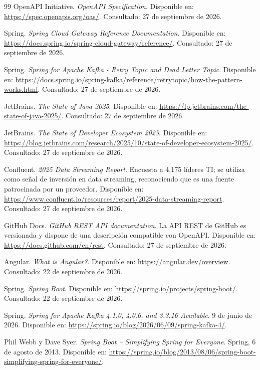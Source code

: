 \documentclass[12pt,a4paper]{article}
\begin{document}
\begin{thebibliography}{99}
OpenAPI Initiative. \textit{OpenAPI Specification}. Disponible en: \url{https://spec.openapis.org/oas/}. Consultado: 27 de septiembre de 2026.

Spring. \textit{Spring Cloud Gateway Reference Documentation}. Disponible en: \url{https://docs.spring.io/spring-cloud-gateway/reference/}. Consultado: 27 de septiembre de 2026.

Spring. \textit{Spring for Apache Kafka - Retry Topic and Dead Letter Topic}. Disponible en: \url{https://docs.spring.io/spring-kafka/reference/retrytopic/how-the-pattern-works.html}. Consultado: 27 de septiembre de 2026.

JetBrains. \textit{The State of Java 2025}. Disponible en: \url{https://lp.jetbrains.com/the-state-of-java-2025/}. Consultado: 27 de septiembre de 2026.

JetBrains. \textit{The State of Developer Ecosystem 2025}. Disponible en: \url{https://blog.jetbrains.com/research/2025/10/state-of-developer-ecosystem-2025/}. Consultado: 27 de septiembre de 2026.

Confluent. \textit{2025 Data Streaming Report}. Encuesta a 4,175 líderes TI; se utiliza como señal de inversión en data streaming, reconociendo que es una fuente patrocinada por un proveedor. Disponible en: \url{https://www.confluent.io/resources/report/2025-data-streaming-report}. Consultado: 27 de septiembre de 2026.

GitHub Docs. \textit{GitHub REST API documentation}. La API REST de GitHub es versionada y dispone de una descripción compatible con OpenAPI. Disponible en: \url{https://docs.github.com/en/rest}. Consultado: 27 de septiembre de 2026.

Angular. \textit{What is Angular?}. Disponible en: \url{https://angular.dev/overview}. Consultado: 22 de septiembre de 2026.

Spring. \textit{Spring Boot}. Disponible en: \url{https://spring.io/projects/spring-boot/}. Consultado: 22 de septiembre de 2026.

Spring. \textit{Spring for Apache Kafka 4.1.0, 4.0.6, and 3.3.16 Available}. 9 de junio de 2026. Disponible en: \url{https://spring.io/blog/2026/06/09/spring-kafka-4/}.

Phil Webb y Dave Syer. \textit{Spring Boot -- Simplifying Spring for Everyone}. Spring, 6 de agosto de 2013. Disponible en: \url{https://spring.io/blog/2013/08/06/spring-boot-simplifying-spring-for-everyone/}.


\end{thebibliography}
\end{document}
